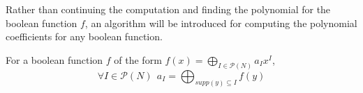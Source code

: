 \par Rather than continuing the computation and finding the polynomial for the boolean function
$f$, an algorithm will be introduced for computing the polynomial coefficients for any boolean
function.

\begin{theorem}
  For a boolean function $f$ of the form $f(x)=\bigoplus_{I\in\mathcal{P}(N)}a_Ix^I$, 
  \begin{equation}
    \forall I \in \mathcal{P}(N) \ \ a_I=\bigoplus_{supp(y)\subseteq I}f(y)
  \end{equation}
\end{theorem}


